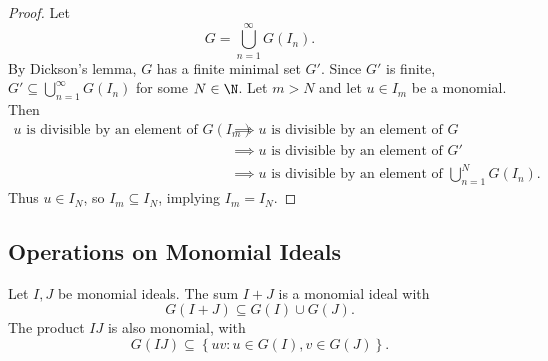 \documentclass[co439]{subfiles}
\begin{document}
    \begin{proof}
        Let
        \begin{equation*}
            G = \bigcup^{\infty}_{n=1} G\left( I_n \right).
        \end{equation*}
        By Dickson's lemma, $G$ has a finite minimal set $G'$. Since $G'$ is finite, $G'\subseteq\bigcup^{\infty}_{n=1} G\left( I_n \right)$ for some $N\in\N$. Let $m>N$ and let $u\in I_m$ be a monomial. Then 
        \begin{equation*}
            \begin{aligned}
                \text{$u$ is divisible by an element of $G\left( I_m \right)$} & \implies \text{$u$ is divisible by an element of $G$} \\
                                                                               & \implies \text{$u$ is divisible by an element of $G'$} \\
                                                                               & \implies \text{$u$ is divisible by an element of $\bigcup^{N}_{n=1}G\left( I_n \right)$.}
            \end{aligned} 
        \end{equation*}
        Thus $u\in I_N$, so $I_m\subseteq I_N$, implying $I_m = I_N$.
    \end{proof}
    
    \subsection{Operations on Monomial Ideals}

    Let $I,J$ be monomial ideals. The sum $I+J$ is a monomial ideal with
    \begin{equation*}
        G\left( I+J \right) \subseteq G\left( I \right)\cup G\left( J \right).
    \end{equation*}
    The product $IJ$ is also monomial, with
    \begin{equation*}
        G\left( IJ \right) \subseteq\left\lbrace uv: u\in G\left( I \right),v\in G\left( J \right) \right\rbrace.
    \end{equation*}
\end{document}
